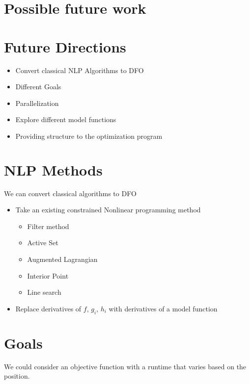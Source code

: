 \documentclass{article} %
\begin{document}
\section{Possible future work}

\section{Future Directions}

\begin{itemize}
\item Convert classical NLP Algorithms to DFO
\item Different Goals
\item Parallelization
\item Explore different model functions
\item Providing structure to the optimization program
\end{itemize}


\section{NLP Methods}

We can convert classical algorithms to DFO

\begin{itemize}
\item Take an existing constrained Nonlinear programming method
	\begin{itemize}
		\item Filter method
		\item Active Set
		\item Augmented Lagrangian
		\item Interior Point
		\item Line search
	\end{itemize}
\item Replace derivatives of $f$, $g_i$, $h_i$ with derivatives of a model function
\end{itemize}






\section{Goals}
We could consider an objective function with a runtime that varies based on the position.
\end{document}
